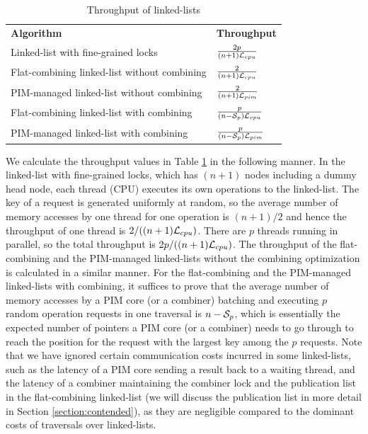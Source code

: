\renewcommand{\arraystretch}{1.6}
\begin{table}[ht!]
\begin{center}
    \begin{tabular}{| >{\small}l | l |}
    \hline
    \textbf{Algorithm} & \textbf{Throughput}\\ \hhline{|=|=|}
    Linked-list with fine-grained locks & ${2p \over (n+1)\mathcal{L}_{cpu}}$ \\ \hline
    Flat-combining linked-list without combining & ${2 \over (n+1)\mathcal{L}_{cpu}}$ \\ \hline
    PIM-managed linked-list without combining & ${2 \over (n+1)\mathcal{L}_{pim}}$ \\ \hline
    Flat-combining linked-list with combining & ${p \over (n-\mathcal{S}_{p})\mathcal{L}_{cpu}}$ \\ \hline
    PIM-managed linked-list with combining & ${p \over (n-\mathcal{S}_{p})\mathcal{L}_{pim}}$ \\ \hline
    \end{tabular}
\end{center}
\caption{Throughput of linked-lists}
\label{tab:linkedlist}
\end{table}

We calculate the throughput values in Table \ref{tab:linkedlist} in the following manner. 
In the linked-list with fine-grained locks, which has $(n+1)$ nodes including 
a dummy head node, each thread (CPU) executes its own operations to the linked-list. 
The key of a request is generated uniformly at random, 
so the average number of memory accesses by one thread for one operation is $(n+1)/2$ 
and hence the throughput of one thread is $2/((n+1)\mathcal{L}_{cpu})$. 
There are $p$ threads running in parallel, so the total throughput is $2p/((n+1)\mathcal{L}_{cpu})$. 
The throughput of the flat-combining and the PIM-managed linked-lists without the combining optimization 
is calculated in a similar manner. 
For the flat-combining and the PIM-managed linked-lists with combining, it suffices to prove that
the average number of memory accesses by a PIM core (or a combiner) batching and executing 
$p$ random operation requests in one traversal is $n - \mathcal{S}_{p}$, 
which is essentially the expected number of pointers a PIM core (or a combiner) 
needs to go through to reach the position for the request with the largest key among the $p$ requests. 
Note that we have ignored certain communication costs incurred in some linked-lists, 
such as the latency of a PIM core sending a result back to a waiting thread, 
and the latency of a combiner maintaining the combiner lock and the publication list in the flat-combining 
linked-list (we will discuss the publication list in more detail in Section \ref{section:contended}), 
as they are negligible compared to the dominant costs of traversals over linked-lists.
 
